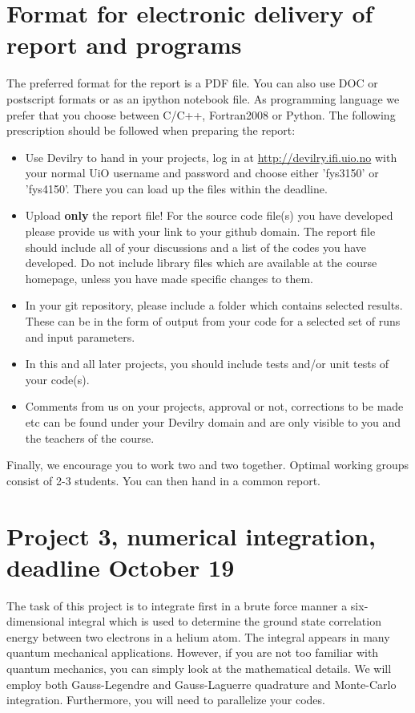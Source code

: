 \documentclass[11pt,a4wide]{article}
\begin{document}
\section*{Format for electronic delivery of report and programs}
%
The preferred format for the report is a PDF file. You can also
use DOC or postscript formats or as an ipython notebook file. 
As programming language we prefer that you choose between C/C++, Fortran2008 or Python.
The following prescription should be followed when preparing the report:
\begin{itemize}
\item Use Devilry to hand in your projects, log in  at 
\url{ http://devilry.ifi.uio.no} with your normal UiO username and password
and choose either 'fys3150' or 'fys4150'.
There you can load up the files within the deadline.
\item Upload {\bf only} the report file!  For the source code file(s) you have developed please provide us with your link to your github domain. 
The report file should include all of your discussions and a list of the codes you have developed. 
Do not include library files which are available at the course homepage, unless you have
made specific changes to them.
\item In your git repository, please include a folder which contains selected results. These can be in the form of output from your code
for a selected set of runs and input parameters. 
\item In this and all later projects, you should include tests and/or unit tests of your code(s).
\item Comments  from us on your projects, approval or not, corrections to be made 
etc can be found under
your Devilry domain and are only visible to you and the teachers of the course.

\end{itemize}

Finally, 
we encourage you to work two and two together. Optimal working groups consist of 
2-3 students. You can then hand in a common report. 


\section*{Project 3, numerical integration, deadline  October 19}

The task of this project is to integrate first in a brute force manner a six-dimensional integral which is used
to determine the ground state correlation energy between two electrons 
in a helium atom.  
The integral appears in many quantum mechanical applications.
However, if you are not too familiar with quantum mechanics, you can simply look at the mathematical details. 
We will employ both Gauss-Legendre and Gauss-Laguerre 
quadrature and Monte-Carlo integration.
Furthermore, you will need to parallelize your codes.
\end{document}
